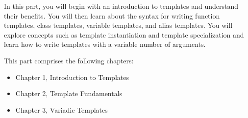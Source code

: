 In this part, you will begin with an introduction to templates and understand their benefits. You will then learn about the syntax for writing function templates, class templates, variable templates, and alias templates. You will explore concepts such as template instantiation and template specialization and learn how to write templates with a variable number of arguments.

This part comprises the following chapters:

\begin{itemize}
\item
Chapter 1, Introduction to Templates

\item
Chapter 2, Template Fundamentals

\item
Chapter 3, Variadic Templates
\end{itemize}